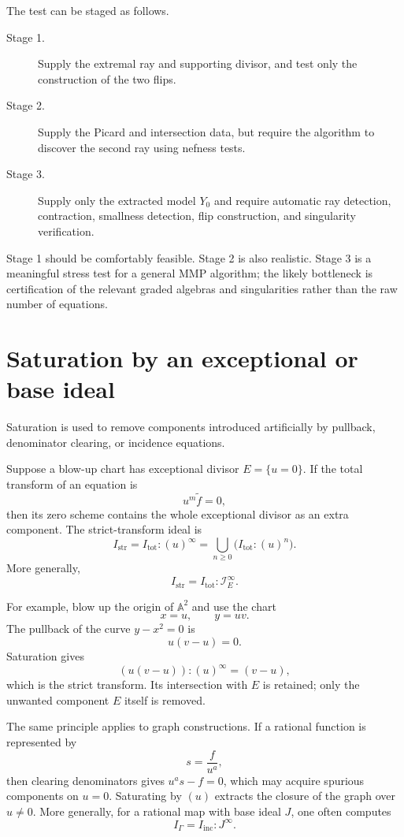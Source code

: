 \documentclass[11pt]{article}
\begin{document}
The test can be staged as follows.
\begin{description}
  \item[Stage 1.] Supply the extremal ray and supporting divisor, and test only
        the construction of the two flips.
  \item[Stage 2.] Supply the Picard and intersection data, but require the
        algorithm to discover the second ray using nefness tests.
  \item[Stage 3.] Supply only the extracted model $Y_0$ and require automatic
        ray detection, contraction, smallness detection, flip construction,
        and singularity verification.
\end{description}
Stage 1 should be comfortably feasible.  Stage 2 is also realistic.  Stage 3
is a meaningful stress test for a general MMP algorithm; the likely bottleneck
is certification of the relevant graded algebras and singularities rather than
the raw number of equations.

\section{Saturation by an exceptional or base ideal}

Saturation is used to remove components introduced artificially by pullback,
denominator clearing, or incidence equations.

Suppose a blow-up chart has exceptional divisor $E=\{u=0\}$.  If the total
transform of an equation is
\[
  u^m\widetilde f=0,
\]
then its zero scheme contains the whole exceptional divisor as an extra
component.  The strict-transform ideal is
\[
  I_{\mathrm{str}}
  =I_{\mathrm{tot}}:(u)^\infty
  =\bigcup_{n\geq0}\bigl(I_{\mathrm{tot}}:(u)^n\bigr).
\]
More generally,
\[
  I_{\mathrm{str}}
  =I_{\mathrm{tot}}:\mathcal I_E^\infty.
\]

For example, blow up the origin of $\mathbb A^2$ and use the chart
\[
  x=u,\qquad y=uv.
\]
The pullback of the curve $y-x^2=0$ is
\[
  u(v-u)=0.
\]
Saturation gives
\[
  (u(v-u)):(u)^\infty=(v-u),
\]
which is the strict transform.  Its intersection with $E$ is retained; only
the unwanted component $E$ itself is removed.

The same principle applies to graph constructions.  If a rational function is
represented by
\[
  s=\frac{f}{u^a},
\]
then clearing denominators gives $u^as-f=0$, which may acquire spurious
components on $u=0$.  Saturating by $(u)$ extracts the closure of the graph
over $u\neq0$.  More generally, for a rational map with base ideal $J$, one
often computes
\[
  I_{\Gamma}=I_{\mathrm{inc}}:J^\infty.
\]
\end{document}
